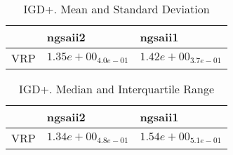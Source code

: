\documentclass{article}
\begin{document}
\begin{table}
\caption{IGD+. Mean and Standard Deviation}
\label{table: IGD+}
\centering
\begin{scriptsize}
\begin{tabular}{lll}
\hline & ngsaii2 &  ngsaii1\\
\hline 
VRP & \cellcolor{gray95}$  1.35e+00_{ 4.0e-01}$ & \cellcolor{gray25}$  1.42e+00_{ 3.7e-01}$ \\
\hline
\end{tabular}
\end{scriptsize}
\end{table}

\begin{table}
\caption{IGD+. Median and Interquartile Range}
\label{table: IGD+}
\centering
\begin{scriptsize}
\begin{tabular}{lll}
\hline & ngsaii2 &  ngsaii1\\
\hline 
VRP & \cellcolor{gray95}$  1.34e+00_{ 4.8e-01}$ & \cellcolor{gray25}$  1.54e+00_{ 5.1e-01}$ \\
\hline
\end{tabular}
\end{scriptsize}
\end{table}
\end{document}
